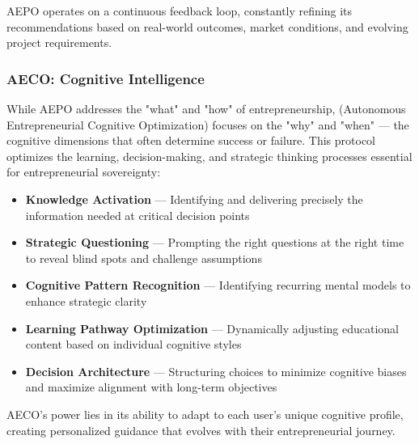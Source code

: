 AEPO operates on a continuous feedback loop, constantly refining its recommendations based on real-world outcomes, market conditions, and evolving project requirements.

\subsubsection*{AECO: Cognitive Intelligence}

While AEPO addresses the "what" and "how" of entrepreneurship,  (Autonomous Entrepreneurial Cognitive Optimization) focuses on the "why" and "when" — the cognitive dimensions that often determine success or failure. This protocol optimizes the learning, decision-making, and strategic thinking processes essential for entrepreneurial sovereignty:

\begin{itemize}
    \item \textbf{Knowledge Activation} — Identifying and delivering precisely the information needed at critical decision points
    
    \item \textbf{Strategic Questioning} — Prompting the right questions at the right time to reveal blind spots and challenge assumptions
    
    \item \textbf{Cognitive Pattern Recognition} — Identifying recurring mental models to enhance strategic clarity
    
    \item \textbf{Learning Pathway Optimization} — Dynamically adjusting educational content based on individual cognitive styles
    
    \item \textbf{Decision Architecture} — Structuring choices to minimize cognitive biases and maximize alignment with long-term objectives
\end{itemize}

AECO's power lies in its ability to adapt to each user's unique cognitive profile, creating personalized guidance that evolves with their entrepreneurial journey.

